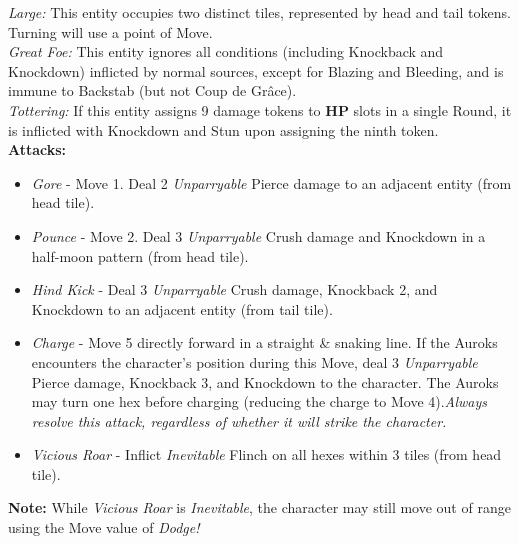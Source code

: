 \emph{Large:} This entity occupies two distinct tiles, represented by head and tail tokens. Turning will use a point of Move.\\

\emph{Great Foe:} This entity ignores all conditions (including Knockback and Knockdown) inflicted by normal sources, except for Blazing and Bleeding, and is immune to Backstab (but not Coup de Grâce).\\

\emph{Tottering:} If this entity assigns 9 damage tokens to \textbf{HP} slots in a single Round, it is inflicted with Knockdown and Stun upon assigning the ninth token.\\

\textbf{Attacks:}
\begin{itemize}
\item \emph{Gore} -  Move 1. Deal 2 \emph{Unparryable} Pierce damage to an adjacent entity (from head tile).
\item \emph{Pounce} - Move 2. Deal 3 \emph{Unparryable} Crush damage and Knockdown in a half-moon pattern (from head tile).
\item \emph{Hind Kick} - Deal 3 \emph{Unparryable} Crush damage, Knockback 2, and Knockdown to an adjacent entity (from tail tile).
\item \emph{Charge} - Move 5 directly forward in a straight \& snaking line. If the Auroks encounters the character’s position during this Move, deal 3 \emph{Unparryable} Pierce damage, Knockback 3, and Knockdown to the character. The Auroks may turn one hex before charging (reducing the charge to Move 4).\newline \emph{Always resolve this attack, regardless of whether it will strike the character.}
\item \emph{Vicious Roar} - Inflict \emph{Inevitable} Flinch on all hexes within 3 tiles (from head tile).
\end{itemize}

\begin{tcolorbox}
\textbf{Note:} While \emph{Vicious Roar} is \emph{Inevitable}, the character may still move out of range using the Move value of \emph{Dodge!}
\end{tcolorbox}

\pagebreak

